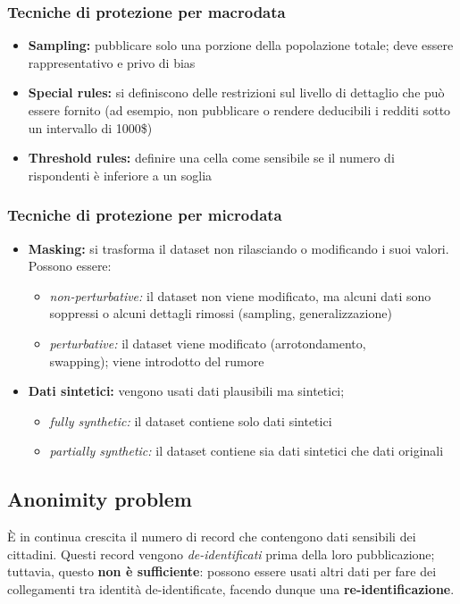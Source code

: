 \documentclass{report}
\begin{document}
\subsubsection{Tecniche di protezione per macrodata}
\begin{itemize}
    \item \textbf{Sampling:} pubblicare solo una porzione della popolazione totale; deve essere rappresentativo e privo di bias
    \item \textbf{Special rules:} si definiscono delle restrizioni sul livello di dettaglio che può essere fornito (ad esempio, non pubblicare o rendere
    deducibili i redditi sotto un intervallo di 1000\$)
    \item \textbf{Threshold rules:} definire una cella come sensibile se il numero di rispondenti è inferiore a un soglia
\end{itemize}

\subsubsection{Tecniche di protezione per microdata}
\begin{itemize}
    \item \textbf{Masking:} si trasforma il dataset non rilasciando o modificando i suoi valori. Possono essere:
    \begin{itemize}
        \item \textit{non-perturbative:} il dataset non viene modificato, ma alcuni dati sono soppressi o alcuni dettagli rimossi (sampling, generalizzazione)
        \item \textit{perturbative:} il dataset viene modificato (arrotondamento, \\swapping); viene introdotto del rumore
    \end{itemize}
    \item \textbf{Dati sintetici:} vengono usati dati plausibili ma sintetici;
    \begin{itemize}
        \item \textit{fully synthetic:} il dataset contiene solo dati sintetici
        \item \textit{partially synthetic:} il dataset contiene sia dati sintetici che dati originali
    \end{itemize}
\end{itemize}

\newpage
\subsection{Anonimity problem}
È in continua crescita il numero di record che contengono dati sensibili dei cittadini. Questi record
vengono \textit{de-identificati} prima della loro pubblicazione; tuttavia, questo \textbf{non è sufficiente}: possono essere 
usati altri dati per fare dei collegamenti tra identità de-identificate, facendo dunque
una \textbf{re-identificazione}.
\end{document}
